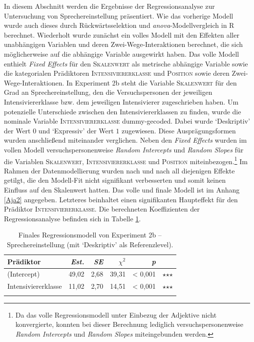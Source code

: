 In diesem Abschnitt werden die Ergebnisse der Regressionsanalyse zur Untersuchung von Sprechereinstellung präsentiert. Wie das vorherige Modell wurde auch dieses durch Rückwärtsselektion und \textit{anova}-Modellvergleich in R berechnet. Wiederholt wurde zunächst ein volles Modell mit den Effekten aller unabhängigen Variablen und deren Zwei-Wege-Interaktionen berechnet, die sich möglicherweise auf die abhängige Variable ausgewirkt haben. Das volle Modell enthielt \textit{Fixed Effects} für den \textsc{Skalenwert} als metrische abhängige Variable sowie die kategorialen Prädiktoren \textsc{Intensiviererklasse} und \textsc{Position} sowie deren Zwei-Wege-Interaktionen. In {Experiment 2b} steht die Variable \textsc{Skalenwert} für den Grad an Sprechereinstellung, den die Versuchspersonen der jeweiligen Intensiviererklasse bzw. dem jeweiligen Intensivierer zugeschrieben haben. Um potenzielle Unterschiede zwischen den Intensiviererklassen zu finden, wurde die nominale Variable \textsc{Intensiviererklasse} dummy-gecoded. Dabei wurde `Deskriptiv' der Wert $0$ und `Expressiv' der Wert $1$ zugewiesen. Diese Ausprägungsformen wurden anschließend miteinander verglichen. Neben den \textit{Fixed Effects} wurden im vollen Modell versuchspersonenweise \textit{Random Intercepts} und \textit{Random Slopes} für die Variablen \textsc{Skalenwert}, \textsc{Intensiviererklasse} und \textsc{Position} miteinbezogen.\footnote{Da das volle Regressionsmodell unter Einbezug der Adjektive nicht konvergierte, konnten bei dieser Berechnung lediglich versuchspersonenweise \textit{Random Intercepts} und \textit{Random Slopes} miteingebunden werden.} Im Rahmen der Datenmodellierung wurden nach und nach all diejenigen Effekte getilgt, die den Modell-Fit nicht signifikant verbesserten und somit keinen Einfluss auf den Skalenwert hatten. Das volle und finale Modell ist im Anhang  \ref{Aja2} angegeben. Letzteres beinhaltet einen signifikanten Haupteffekt für den Prädiktor \textsc{Intensiviererklasse}. Die berechneten Koeffizienten der Regressionsanalyse befinden sich in {Tabelle \ref{LinReg2}}.

%
\begin{table}
\begin{tabularx}{.8\textwidth}{Xrrrrr}
\lsptoprule
Prädiktor & \textit{Est.} & \textit{SE} & \textit{$\chi$$^{2}$} & \textit{p} & \\
\midrule

(Intercept) & 49,02 & 2,68 & 39,31 & < 0,001 & $\star$$\star$$\star$\\
Intensiviererklasse & 11,02 & 2,70 & 14,51 & < 0,001 & $\star$$\star$$\star$\\
\lspbottomrule

\end{tabularx}
\caption[Finales Regressionsmodell von Experiment 2b (mit `Deskriptiv' als Referenzlevel)]{Finales Regressionsmodell von Experiment 2b -- Sprechereinstellung (mit `Deskriptiv' als Referenzlevel).}
\label{LinReg2}
\end{table}

